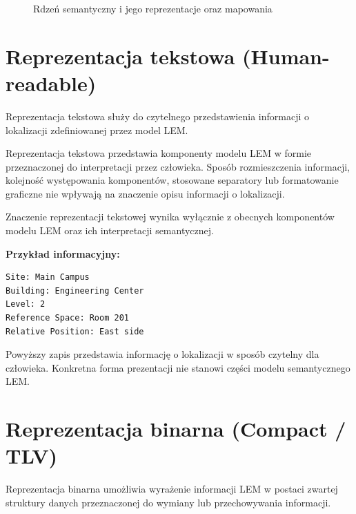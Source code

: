 \begin{figure}[htbp]
\centering
{}
\caption{Rdzeń semantyczny i jego reprezentacje oraz mapowania}
\label{fig:lem-representations}
\end{figure}

\section{Reprezentacja tekstowa (Human-readable)}
\label{sec:reprezentacja-tekstowa}
Reprezentacja tekstowa służy do czytelnego przedstawienia informacji o lokalizacji zdefiniowanej przez model LEM.

Reprezentacja tekstowa przedstawia komponenty modelu LEM w formie przeznaczonej do interpretacji przez człowieka. Sposób rozmieszczenia informacji, kolejność występowania komponentów, stosowane separatory lub formatowanie graficzne nie wpływają na znaczenie opisu informacji o lokalizacji.

Znaczenie reprezentacji tekstowej wynika wyłącznie z obecnych komponentów modelu LEM oraz ich interpretacji semantycznej.

\noindent \textbf{Przykład informacyjny:}
\begin{verbatim}
Site: Main Campus
Building: Engineering Center
Level: 2
Reference Space: Room 201
Relative Position: East side
\end{verbatim}

Powyższy zapis przedstawia informację o lokalizacji w sposób czytelny dla człowieka. Konkretna forma prezentacji nie stanowi części modelu semantycznego LEM.

\section{Reprezentacja binarna (Compact / TLV)}
\label{sec:reprezentacja-binarna}
Reprezentacja binarna umożliwia wyrażenie informacji LEM w postaci zwartej struktury danych przeznaczonej do wymiany lub przechowywania informacji.

